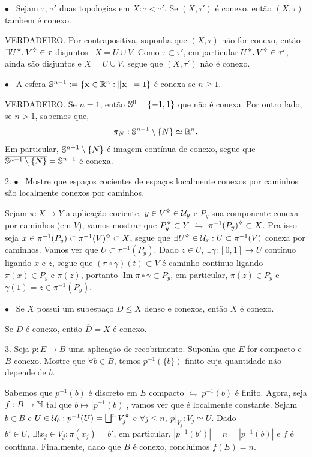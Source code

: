 \(\bullet\) \ Sejam \(\tau, \ \tau'\) duas topologias em \(X  : \tau < \tau'\). Se \((X,\tau')\) é conexo, então \((X,\tau)\) tambem é conexo.  

\textcolor{gris}{VERDADEIRO. Por contrapositiva, suponha que \((X, \tau)\) não for conexo, então \(\exists U\ab, V\ab \in \tau\) disjuntos \(: X = U \cup V\). Como \(\tau \subset \tau'\), em particular \(U\ab, V\ab \in \tau'\), ainda são disjuntos e \(X = U \cup V\), segue que \((X, \tau')\) não é conexo.}

\(\bullet\) \ A esfera \(\mathbb{S}^{n-1}:= \{\textbf{x} \in \mathbb{R}^n : \|\textbf{x}\| =1\} \) é conexa se \(n\geq 1\). 

\textcolor{gris}{VERDADEIRO. Se \(n=1\), então \(\mathbb{S}^0= \{-1,1\}\) que não é conexa. Por outro lado, se \(n>1\), sabemos que,  
\[\pi_N : \mathbb{S}^{n-1}\setminus \{N\} \simeq \mathbb{R}^n.\] 
Em particular, \(\mathbb{S}^{n-1}\setminus \{N\}\) é imagem contínua de conexo, segue que \(\overline{\mathbb{S}^{n-1}\setminus \{N\}} = \mathbb{S}^{n-1}\) é conexa. }

2. \(\bullet\) \ Mostre que espaços cocientes de espaços localmente conexos por caminhos são localmente conexos por caminhos. 

\textcolor{gris}{Sejam \(\pi: X \to Y \) a aplicação cociente, \(y\in V\ab \in \U_y\) e \(P_y\) sua componente conexa por caminhos (em \(V\)), vamos mostrar que \(P_y \ab \subset Y \ \leftrightharpoons \ \pi^{-1}(P_y)\ab \subset X \). Pra isso seja \(x \in \pi^{-1}(P_y) \subset \pi^{-1}(V)\ab \subset X\), segue que \(\exists U\ab \in \U_x : U \subset \pi^{-1}(V)\) conexa por caminhos. Vamos ver que \(U \subset \pi^{-1}(P_y)\). Dado \(z\in U, \ \exists \gamma : [0,1] \to U\) contínuo ligando \(x \) e \(z\), segue que \((\pi \circ \gamma) (t)\subset V\) é caminho contínuo ligando \(\pi(x) \in P_y\) e \(\pi(z)\), portanto \(\operatorname{Im} \pi \circ \gamma \subset P_y\), em particular, \(\pi(z) \in P_y\) e \(\gamma (1) = z \in \pi^{-1}(P_y)\). }

\(\bullet\) \ Se \(X\) possui um subespaço \(D \leq X\) denso e conexos, então \(X\) é conexo. 

\textcolor{gris}{Se \(D\) é conexo, então \(\overline{D} = X\) é conexo. }

3. Seja \(p: E \to B\) uma aplicação de recobrimento. Suponha que \(E\) for compacto e \(B\) conexo. Mostre que \(\forall b \in B\), temos \(p^{-1}(\{b\})\) finito cuja quantidade não depende de \(b\). 

\textcolor{gris}{Sabemos que \(p^{-1}(b)\) é discreto em \(E\) compacto \(\leftrightharpoons \ p^{-1}(b) \) é finito. Agora, seja \(f : B \to \mathbb{N}\) tal que \(b \mapsto |p^{-1}(b)| \), vamos ver que é localmente constante. Sejam  \(b \in B\) e \(U \in \U_b : p^{-1}(U) = \bigsqcup^n V_j\ab \) e \(\forall j \leq n, \ p|_{V_j}: V_j \simeq U\). Dado \(b' \in U, \ \exists ! x_j \in V_j : \pi(x_j) = b' \), em particular, \(|p^{-1}(b')| =n = |p^{-1}(b)| \) e \(f\) é contínua. Finalmente, dado que \(B\) é conexo, concluimos \(f(E) =n \).   \\  }

